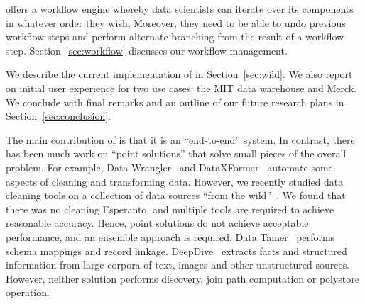 \stitle{[Workflow.]} 
\dcv offers a workflow engine whereby data scientists can iterate over its components in whatever order they wish,  Moreover, they need to be able to undo previous workflow steps and perform alternate branching from the result of a workflow step.  Section~\ref{sec:workflow} discusses our workflow management.


We describe the current implementation of \dcv in Section~\ref{sec:wild}. We also report on initial user experience for two use cases: the MIT data warehouse and Merck. We conclude with final remarks and an outline of our future research plans in Section~\ref{sec:conclusion}.


The main contribution of \dcv is that it is an ``end-to-end'' system. In contrast, there has been much work on ``point solutions'' that solve small pieces of the overall problem. For example, Data Wrangler~\cite{2011-wrangler} and DataXFormer~\cite{DBLP:conf/icde/AbedjanMIOPS16} automate some aspects of cleaning and transforming data.
However, we recently studied data cleaning tools on a collection of data sources ``from the wild''~\cite{DBLP:journals/pvldb/AbedjanCDFIOPST16}. We found that there was no cleaning Esperanto, and multiple tools are required to achieve reasonable accuracy.  Hence, point solutions do not achieve acceptable performance, and an ensemble approach is required.
%
Data Tamer~\cite{DBLP:conf/cidr/StonebrakerBIBCZPX13} performs schema mappings and record linkage. DeepDive~\cite{DBLP:journals/pvldb/ShinWWSZR15} extracts facts and structured information from large corpora of text, images and other unstructured sources. However, neither solution performs  discovery, join path computation or polystore operation.

